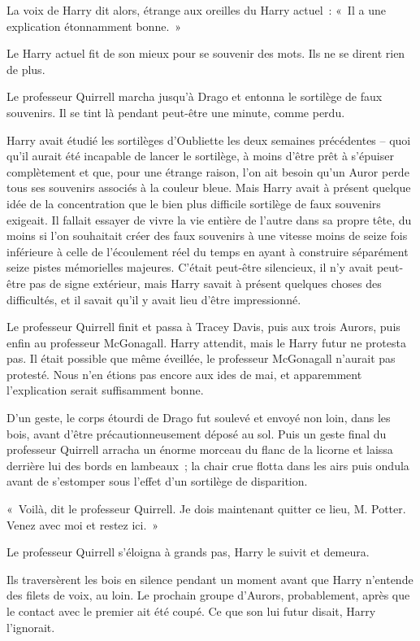 La voix de Harry dit alors, étrange aux oreilles du Harry actuel~: «~Il a une explication étonnamment bonne.~»

Le Harry actuel fit de son mieux pour se souvenir des mots. Ils ne se dirent rien de plus.

Le professeur Quirrell marcha jusqu'à Drago et entonna le sortilège de faux souvenirs. Il se tint là pendant peut-être une minute, comme perdu.

Harry avait étudié les sortilèges d'Oubliette les deux semaines précédentes -- quoi qu'il aurait été incapable de lancer le sortilège, à moins d'être prêt à s'épuiser complètement et que, pour une étrange raison, l'on ait besoin qu'un Auror perde tous ses souvenirs associés à la couleur bleue. Mais Harry avait à présent quelque idée de la concentration que le bien plus difficile sortilège de faux souvenirs exigeait. Il fallait essayer de vivre la vie entière de l'autre dans sa propre tête, du moins si l'on souhaitait créer des faux souvenirs à une vitesse moins de seize fois inférieure à celle de l'écoulement réel du temps en ayant à construire séparément seize pistes mémorielles majeures. C'était peut-être silencieux, il n'y avait peut-être pas de signe extérieur, mais Harry savait à présent quelques choses des difficultés, et il savait qu'il y avait lieu d'être impressionné.

Le professeur Quirrell finit et passa à Tracey Davis, puis aux trois Aurors, puis enfin au professeur McGonagall. Harry attendit, mais le Harry futur ne protesta pas. Il était possible que même éveillée, le professeur McGonagall n'aurait pas protesté. Nous n'en étions pas encore aux ides de mai, et apparemment l'explication serait suffisamment bonne.

D'un geste, le corps étourdi de Drago fut soulevé et envoyé non loin, dans les bois, avant d'être précautionneusement déposé au sol. Puis un geste final du professeur Quirrell arracha un énorme morceau du flanc de la licorne et laissa derrière lui des bords en lambeaux~; la chair crue flotta dans les airs puis ondula avant de s'estomper sous l'effet d'un sortilège de disparition.

«~Voilà, dit le professeur Quirrell. Je dois maintenant quitter ce lieu, M. Potter. Venez avec moi et restez ici.~»

Le professeur Quirrell s'éloigna à grands pas, Harry le suivit et demeura.

Ils traversèrent les bois en silence pendant un moment avant que Harry n'entende des filets de voix, au loin. Le prochain groupe d'Aurors, probablement, après que le contact avec le premier ait été coupé. Ce que son lui futur disait, Harry l'ignorait.


